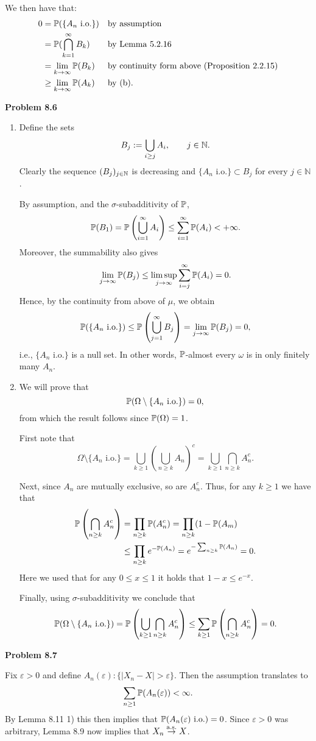 We then have that:
\begin{align*}
	0 &= \mathbb P(\{A_n \text{ i.o.}\}) &&\text{by assumption} \\
	&= \mathbb P(\bigcap_{k =1}^\infty B_k) &&\text{by Lemma 5.2.16}\\
	&= \lim_{k \to \infty} \mathbb P(B_k) &&\text{by continuity form above (Proposition 2.2.15)}\\
	&\ge \lim_{k \to \infty} \mathbb P(A_k) &&\text{by (b)}.
\end{align*}

\bigskip

\textbf{Problem 8.6}
\begin{enumerate}[label={(\alph*)}]
\item Define the sets
\[
	B_j := \bigcup_{i \ge j} A_i,\qquad j\in\mathbb N.
\]
Clearly the sequence $(B_j)_{j\in\mathbb N}$ is decreasing and $\{A_n \text{ i.o.}\}\subset B_j$ for every $j \in \mathbb{N}$. 

By assumption, and the $\sigma$-subadditivity of $\mathbb P$,
\[
\mathbb P(B_1) = \mathbb P\left(\bigcup_{i=1}^\infty A_i \right) \leq \sum_{i=1}^\infty \mathbb P(A_i) < +\infty.
\]
Moreover, the summability also gives
\[
	\lim_{j\to\infty}\mathbb P(B_j) \leq \limsup_{j\to\infty}\sum_{i=j}^\infty \mathbb P(A_i) = 0.
\]
Hence, by the continuity from above of $\mu$, we obtain
\[
	\mathbb P(\{A_n \text{ i.o.}\}) \le \mathbb P\left(\bigcup_{j=1}^\infty B_j\right) = \lim_{j\to \infty} \mathbb P(B_j) = 0,
\]
i.e., $\{A_n \text{ i.o.}\}$ is a null set. In other words, $\mathbb P$-almost every $\omega$ is in only finitely many $A_n$.
\item We will prove that 
\[
	\mathbb P(\Omega \setminus \{A_n \text{ i.o.}\}) = 0,
\]
from which the result follows since $\mathbb P(\Omega) = 1$.

First note that
\[
	\Omega \setminus \{A_n \text{ i.o.}\} = \bigcup_{k \ge 1} \left(\bigcup_{n \ge k} A_n\right)^c
	= \bigcup_{k \ge 1} \bigcap_{n \ge k} A_n^c.
\]

Next, since $A_n$ are mutually exclusive, so are $A_n^c$. Thus, for any $k \ge 1$ we have that
\begin{align*}
	\mathbb P\left(\bigcap_{n \ge k} A_n^c\right) &= \prod_{n \ge k} \mathbb P(A_n^c) = \prod_{n \ge k} (1-\mathbb P(A_m)\\
	&\le \prod_{n \ge k} e^{-\mathbb P(A_n)} = e^{-\sum_{n \ge k} \mathbb P(A_n)} = 0.
\end{align*}
Here we used that for any $0 \le x \le 1$ it holds that $1-x \le e^{-x}$.

Finally, using $\sigma$-subadditivity we conclude that
\[
	\mathbb P(\Omega \setminus \{A_n \text{ i.o.}\}) = \mathbb P\left(\bigcup_{k \ge 1} \bigcap_{n \ge k} A_n^c\right)
	\le \sum_{k \ge 1} \mathbb P\left(\bigcap_{n \ge k} A_n^c\right) = 0.
\]
\end{enumerate}

\bigskip

\textbf{Problem 8.7}

Fix $\varepsilon > 0$ and define $A_n(\varepsilon) :\{|X_n - X| > \varepsilon\}$. Then the assumption translates to
\[
	\sum_{n \ge 1} \mathbb P(A_n(\varepsilon)) < \infty.
\]
By Lemma 8.11 1) this then implies that $\mathbb P(A_n(\varepsilon) \text{ i.o.}) = 0$. Since $\varepsilon > 0$ was arbitrary, Lemma 8.9 now implies that $X_n \stackrel{\mathrm{a.s.}}{\rightarrow} X$.
